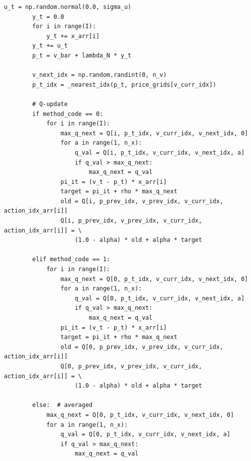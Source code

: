 \begin{lstlisting}[style=pythonstyle]
        u_t = np.random.normal(0.0, sigma_u)
        y_t = 0.0
        for i in range(I):
            y_t += x_arr[i]
        y_t += u_t
        p_t = v_bar + lambda_N * y_t

        v_next_idx = np.random.randint(0, n_v)
        p_t_idx = _nearest_idx(p_t, price_grids[v_curr_idx])

        # Q-update
        if method_code == 0:
            for i in range(I):
                max_q_next = Q[i, p_t_idx, v_curr_idx, v_next_idx, 0]
                for a in range(1, n_x):
                    q_val = Q[i, p_t_idx, v_curr_idx, v_next_idx, a]
                    if q_val > max_q_next:
                        max_q_next = q_val
                pi_it = (v_t - p_t) * x_arr[i]
                target = pi_it + rho * max_q_next
                old = Q[i, p_prev_idx, v_prev_idx, v_curr_idx, action_idx_arr[i]]
                Q[i, p_prev_idx, v_prev_idx, v_curr_idx, action_idx_arr[i]] = \
                    (1.0 - alpha) * old + alpha * target

        elif method_code == 1:
            for i in range(I):
                max_q_next = Q[0, p_t_idx, v_curr_idx, v_next_idx, 0]
                for a in range(1, n_x):
                    q_val = Q[0, p_t_idx, v_curr_idx, v_next_idx, a]
                    if q_val > max_q_next:
                        max_q_next = q_val
                pi_it = (v_t - p_t) * x_arr[i]
                target = pi_it + rho * max_q_next
                old = Q[0, p_prev_idx, v_prev_idx, v_curr_idx, action_idx_arr[i]]
                Q[0, p_prev_idx, v_prev_idx, v_curr_idx, action_idx_arr[i]] = \
                    (1.0 - alpha) * old + alpha * target

        else:  # averaged
            max_q_next = Q[0, p_t_idx, v_curr_idx, v_next_idx, 0]
            for a in range(1, n_x):
                q_val = Q[0, p_t_idx, v_curr_idx, v_next_idx, a]
                if q_val > max_q_next:
                    max_q_next = q_val


\end{lstlisting}
